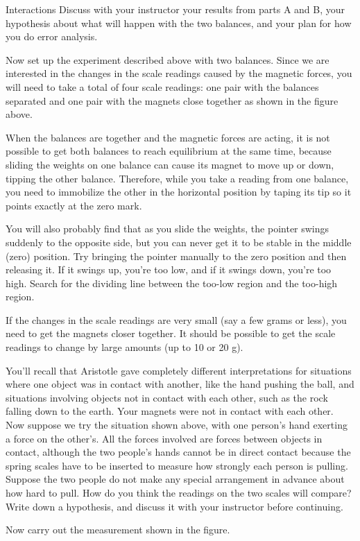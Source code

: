 \begin{lab}{Interactions}
Discuss with your instructor your results from parts A and
B, your hypothesis about what will happen with the two
balances, and your plan for how you do error analysis. 

Now set up the experiment described above with two balances.
 Since we are interested in the changes in the scale
readings caused by the magnetic forces, you will need to
take a total of four scale readings: one pair with the
balances separated and one pair with the magnets close
together as shown in the figure above.

When the balances are together and the magnetic forces are
acting, it is not possible to get both balances to reach
equilibrium at the same time, because sliding the weights on
one balance can cause its magnet to move up or down, tipping
the other balance.  Therefore, while you take a reading from
one balance, you need to immobilize the other in the
horizontal position by taping its tip so it points
exactly at the zero mark.

You will also probably find that as you slide the weights,
the pointer swings suddenly to the opposite side, but you
can never get it to be stable in the middle (zero) position.
 Try bringing the pointer manually to the zero position and
then releasing it.  If it swings up, you're too low, and if
it swings down, you're too high.  Search for the dividing
line between the too-low region and the too-high region.

If the changes in the scale readings are very small (say a
few grams or less), you need to get the magnets closer
together.  It should be possible to get the scale readings
to change by large amounts (up to 10 or 20 g).


You'll recall that Aristotle gave completely different
interpretations for situations where one object was in
contact with another, like the hand pushing the ball, and
situations involving objects not in contact with each other,
such as the rock falling down to the earth.  Your magnets
were not in contact with each other.  Now suppose we try the
situation shown above, with one person's hand exerting a
force on the other's.  All the forces involved are forces
between objects in contact, although the two people's hands
cannot be in direct contact because the spring scales have
to be inserted to measure how strongly each person is
pulling.  Suppose the two people do not make any special
arrangement in advance about how hard to pull.  How do you
think the readings on the two scales will compare?  Write
down a hypothesis, and discuss it with your instructor before continuing.


Now carry out the measurement shown in the figure.


\end{lab}

